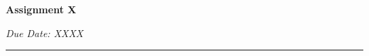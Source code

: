 \documentclass[12pt]{article}
\begin{document}
\begin{center}
\textbf{\huge Assignment X}


{\large\emph{Due Date: XXXX}}
\vspace{1em}
\end{center}
\hrule








\end{document}
